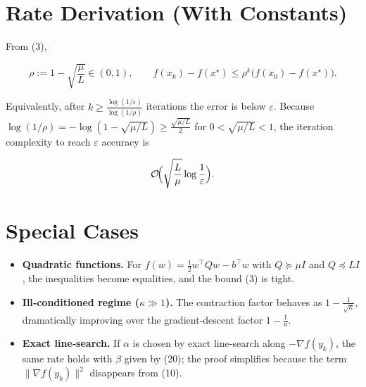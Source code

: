 \documentclass{article}
\begin{document}
\section*{Rate Derivation (With Constants)}
From (3),

\[
\boxed{
\rho:=1-\sqrt{\frac{\mu}{L}}\in(0,1),\qquad
f(x_k)-f(x^{\star})\le \rho^{k}\bigl(f(x_0)-f(x^{\star})\bigr).
}
\]

Equivalently, after $k\ge \frac{\log(1/\varepsilon)}{\log(1/\rho)}$ iterations the error is below $\varepsilon$.  
Because $\log(1/\rho)= -\log(1-\sqrt{\mu/L})\ge \frac{\sqrt{\mu/L}}{2}$ for $0<\sqrt{\mu/L}<1$, the iteration complexity to reach $\varepsilon$ accuracy is  

\[
\mathcal{O}\!\Bigl(\sqrt{\frac{L}{\mu}}\log\frac{1}{\varepsilon}\Bigr).
\]

\section*{Special Cases}
\begin{itemize}
\item \textbf{Quadratic functions.} For $f(w)=\tfrac12 w^{\top}Qw-b^{\top}w$ with $Q\succeq\mu I$ and $Q\preceq L I$, the inequalities become equalities, and the bound (3) is tight.
\item \textbf{Ill‑conditioned regime ($\kappa\gg1$).} The contraction factor behaves as $1-\frac{1}{\sqrt{\kappa}}$, dramatically improving over the gradient‑descent factor $1-\frac{1}{\kappa}$.
\item \textbf{Exact line‑search.} If $\alpha$ is chosen by exact line‑search along $-\nabla f(y_k)$, the same rate holds with $\beta$ given by (20); the proof simplifies because the term $\|\nabla f(y_k)\|^{2}$ disappears from (10).
\end{itemize}
\end{document}
